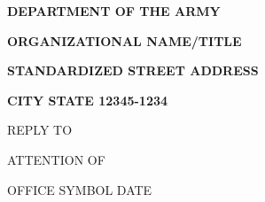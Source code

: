 \documentclass[12pt,letterpaper,oneside]{report}
\begin{document}
\thispagestyle{empty}

{\footnotesize \centerline{\textbf{DEPARTMENT OF THE ARMY}}}
{\scriptsize \centerline{\textbf{ORGANIZATIONAL NAME/TITLE}}}
{\scriptsize \centerline{\textbf{STANDARDIZED STREET ADDRESS}}}
{\scriptsize \centerline{\textbf{CITY STATE 12345-1234}}}

{}

\setlength{\parindent}{14.82mm}
\setlength{\parskip}{-8pt}
{\tiny REPLY TO}

\setlength{\parindent}{14.82mm}
\setlength{\parskip}{-8pt}
{\tiny ATTENTION OF}

\setlength{\parskip}{12pt}
\noindent
OFFICE SYMBOL \hfill DATE
\end{document}
